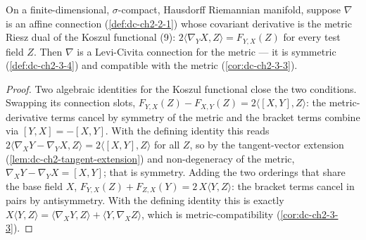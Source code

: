 \begin{lemma}
  \label{lem:dc-ch2-3-6-exist}
  \leanok
  On a finite-dimensional, $\sigma$-compact, Hausdorff Riemannian manifold, suppose
  $\nabla$ is an affine connection (\cref{def:dc-ch2-2-1}) whose covariant derivative
  is the metric Riesz dual of the Koszul functional (9): $2\langle\nabla_Y X, Z\rangle
  = F_{Y,X}(Z)$ for every test field $Z$. Then $\nabla$ is a Levi-Civita connection
  for the metric — it is symmetric (\cref{def:dc-ch2-3-4}) and compatible with the
  metric (\cref{cor:dc-ch2-3-3}).
\end{lemma}
\begin{proof}
  \leanok
  Two algebraic identities for the Koszul functional close the two conditions.
  Swapping its connection slots, $F_{Y,X}(Z)-F_{X,Y}(Z)=2\langle[X,Y],Z\rangle$: the
  metric-derivative terms cancel by symmetry of the metric and the bracket terms
  combine via $[Y,X]=-[X,Y]$. With the defining identity this reads
  $2\langle\nabla_X Y-\nabla_Y X, Z\rangle=2\langle[X,Y],Z\rangle$ for all $Z$, so by
  the tangent-vector extension (\cref{lem:dc-ch2-tangent-extension}) and
  non-degeneracy of the metric, $\nabla_X Y-\nabla_Y X=[X,Y]$; that is symmetry.
  Adding the two orderings that share the base field $X$,
  $F_{Y,X}(Z)+F_{Z,X}(Y)=2\,X\langle Y,Z\rangle$: the bracket terms cancel in pairs by
  antisymmetry. With the defining identity this is exactly
  $X\langle Y,Z\rangle=\langle\nabla_X Y, Z\rangle+\langle Y,\nabla_X Z\rangle$, which
  is metric-compatibility (\cref{cor:dc-ch2-3-3}).
\end{proof}

